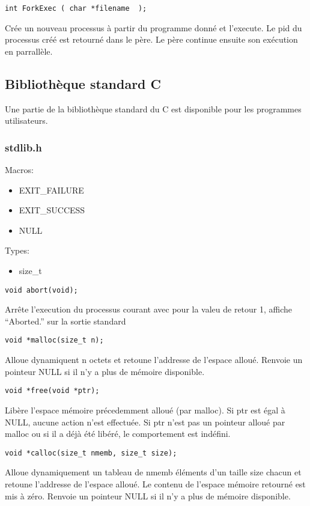 \documentclass{article}
\begin{document}
\begin{verbatim}
int ForkExec ( char *filename  );
\end{verbatim}
Crée un nouveau processus à partir du programme donné et l'execute. Le pid du processus créé est retourné dans le père.
Le père continue ensuite son exécution en parrallèle.

\subsection{Bibliothèque standard C}
Une partie de la bibliothèque standard du C est disponible pour les programmes utilisateurs.
\subsubsection{stdlib.h}
Macros:
\begin{itemize}
\item EXIT\_FAILURE
\item EXIT\_SUCCESS
\item NULL
\end{itemize}
Types:
\begin{itemize}
\item size\_t
\end{itemize}
\begin{verbatim}
void abort(void);
\end{verbatim}
Arrête l'execution du processus courant avec pour la valeu de retour 1, affiche  ``Aborted.'' sur la sortie standard

\begin{verbatim}
void *malloc(size_t n);
\end{verbatim}
Alloue dynamiquent n octets et retoune l'addresse de l'espace alloué.
Renvoie un pointeur NULL si il n'y a plus de mémoire disponible.

\begin{verbatim}
void *free(void *ptr);
\end{verbatim}
Libère l'espace mémoire précedemment alloué (par malloc).
Si ptr est égal à NULL, aucune action n'est effectuée.
Si ptr n'est pas un pointeur alloué par malloc ou si il a déjà été libéré, le comportement
est indéfini.

\begin{verbatim}
void *calloc(size_t nmemb, size_t size);
\end{verbatim}
Alloue dynamiquement un tableau de nmemb éléments d'un taille size chacun et retoune l'addresse de l'espace alloué.
Le contenu de l'espace mémoire retourné est mis à zéro.
Renvoie un pointeur NULL si il n'y a plus de mémoire disponible.
\end{document}
